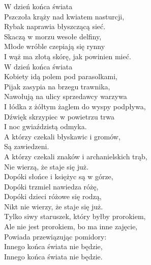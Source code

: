 
\begin{flushleft}
W dzień końca świata  \\
Pszczoła krąży nad kwiatem nasturcji,  \\
Rybak naprawia błyszczącą sieć.  \\
Skaczą w morzu wesołe delfiny,  \\
Młode wróble czepiają się rynny  \\
I wąż ma złotą skórę, jak powinien mieć. \\
\vskip 3mm
W dzień końca świata  \\
Kobiety idą polem pod parasolkami,  \\
Pijak zasypia na brzegu trawnika,  \\
Nawołują na ulicy sprzedawcy warzywa  \\
I łódka z żółtym żaglem do wyspy podpływa,  \\
Dźwięk skrzypiec w powietrzu trwa  \\
I noc gwiaździstą odmyka. \\
\vskip 3mm
A którzy czekali błyskawic i gromów,  \\
Są zawiedzeni.  \\
A którzy czekali znaków i archanielskich trąb,  \\
Nie wierzą, że staje się już.  \\
Dopóki słońce i księżyc są w górze,  \\
Dopóki trzmiel nawiedza różę,  \\
Dopóki dzieci różowe się rodzą,  \\
Nikt nie wierzy, że staje się już. \\
\vskip 3mm
Tylko siwy staruszek, który byłby prorokiem,  \\
Ale nie jest prorokiem, bo ma inne zajęcie,  \\
Powiada przewiązując pomidory:  \\
Innego końca świata nie będzie,  \\
Innego końca świata nie będzie. \\
\vskip 3mm
\end{flushleft}
\clearpage